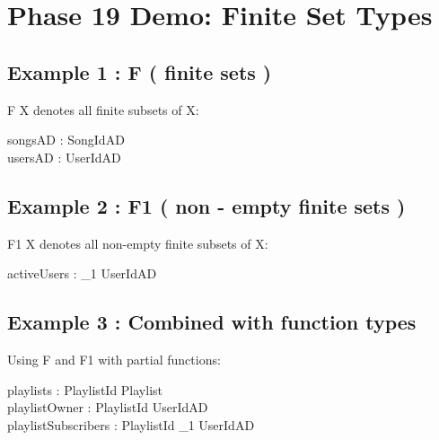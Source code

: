 \documentclass[a4paper,10pt,fleqn]{article}
\begin{document}
\section*{Phase 19 Demo: Finite Set Types}

\subsection*{Example 1 : F ( finite sets )}

\noindent F X denotes all finite subsets of X:

\bigskip

\begin{zed}
\end{zed}

\begin{axdef}
songsAD : \finset SongIdAD \\
usersAD : \finset UserIdAD
\end{axdef}

\subsection*{Example 2 : F1 ( non - empty finite sets )}

\noindent F1 X denotes all non-empty finite subsets of X:

\bigskip

\begin{axdef}
activeUsers : \finset_1 UserIdAD
\end{axdef}

\subsection*{Example 3 : Combined with function types}

\noindent Using F and F1 with partial functions:

\bigskip

\begin{zed}
\end{zed}

\begin{axdef}
playlists : PlaylistId \pfun Playlist \\
playlistOwner : PlaylistId \pfun UserIdAD \\
playlistSubscribers : PlaylistId \pfun \finset_1 UserIdAD
\end{axdef}
\end{document}
